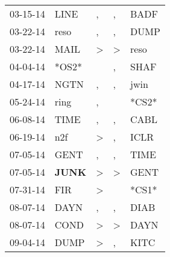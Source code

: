 \begin{supertabular}{p{0.07\textwidth}p{0.06\textwidth}p{0.02\textwidth}p{0.02\textwidth}p{0.06\textwidth}}
          03-15-14\textsuperscript{} &           LINE\textsuperscript{} &                , &                , &           BADF\textsuperscript{} \\
          03-22-14\textsuperscript{} &           reso\textsuperscript{} &                , &                , &           DUMP\textsuperscript{} \\
          03-22-14\textsuperscript{} &           MAIL\textsuperscript{} &     \textgreater &     \textgreater &           reso\textsuperscript{} \\
          04-04-14\textsuperscript{} &                            *OS2* &                  &                , &           SHAF\textsuperscript{} \\
          04-17-14\textsuperscript{} &           NGTN\textsuperscript{} &                , &                , &           jwin\textsuperscript{} \\
          05-24-14\textsuperscript{} &           ring\textsuperscript{} &                , &                  &                            *CS2* \\
          06-08-14\textsuperscript{} &           TIME\textsuperscript{} &                , &                , &           CABL\textsuperscript{} \\
          06-19-14\textsuperscript{} &            n2f\textsuperscript{} &     \textgreater &                , &           ICLR\textsuperscript{} \\
          07-05-14\textsuperscript{} &           GENT\textsuperscript{} &                , &                , &           TIME\textsuperscript{} \\
          07-05-14\textsuperscript{} &  \textbf{JUNK\textsuperscript{}} &     \textgreater &     \textgreater &           GENT\textsuperscript{} \\
          07-31-14\textsuperscript{} &            FIR\textsuperscript{} &     \textgreater &                  &                            *CS1* \\
          08-07-14\textsuperscript{} &           DAYN\textsuperscript{} &                , &                , &           DIAB\textsuperscript{} \\
          08-07-14\textsuperscript{} &           COND\textsuperscript{} &     \textgreater &     \textgreater &           DAYN\textsuperscript{} \\
          09-04-14\textsuperscript{} &           DUMP\textsuperscript{} &     \textgreater &                , &           KITC\textsuperscript{} \\

\end{supertabular}
